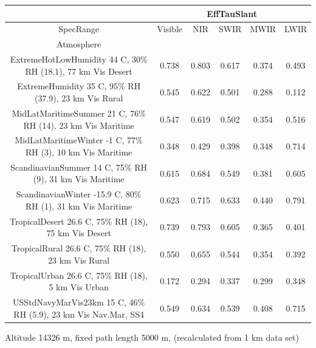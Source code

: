 \documentclass{workpackage}
\begin{document}
\begin{center}

\begin{footnotesize}

\begin{tabular}{|c|c|c|c|c|c|}
\hline
&\multicolumn{5}{|c|}{EffTauSlant}\\\hline
SpecRange&Visible&NIR&SWIR&MWIR&LWIR\\\hline
Atmosphere&&&&&\\\hline
ExtremeHotLowHumidity 44 C, 30\% RH (18.1), 77 km Vis Desert&0.738&0.803&0.617&0.374&0.493\\\hline
ExtremeHumidity 35 C, 95\% RH (37.9), 23 km Vis Rural&0.545&0.622&0.501&0.288&0.112\\\hline
MidLatMaritimeSummer 21 C, 76\% RH (14), 23 km Vis Maritime&0.547&0.619&0.502&0.354&0.516\\\hline
MidLatMaritimeWinter -1 C, 77\% RH (3), 10 km Vis Maritime&0.348&0.429&0.398&0.348&0.714\\\hline
ScandinavianSummer 14 C, 75\% RH (9), 31 km Vis Maritime&0.615&0.684&0.549&0.381&0.605\\\hline
ScandinavianWinter -15.9 C, 80\% RH (1), 31 km Vis Maritime&0.623&0.715&0.633&0.440&0.791\\\hline
TropicalDesert 26.6 C, 75\% RH (18), 75 km Vis Desert&0.739&0.793&0.605&0.365&0.401\\\hline
TropicalRural 26.6 C, 75\% RH (18), 23 km Vis Rural&0.550&0.655&0.544&0.354&0.392\\\hline
TropicalUrban 26.6 C, 75\% RH (18), 5 km Vis Urban&0.172&0.294&0.337&0.299&0.348\\\hline
USStdNavyMarVis23km 15 C, 46\% RH (5.9), 23 km Vis Nav.Mar, SS4&0.549&0.634&0.539&0.408&0.715\\\hline

\end{tabular}
\end{footnotesize}
\end{center}

Altitude 14326 m, fixed path length 5000 m, (recalculated from 1 km data set)
\end{document}
